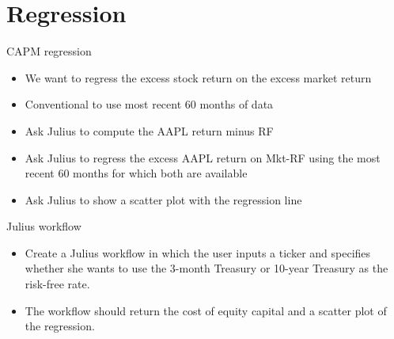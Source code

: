 \documentclass[10pt]{beamer}
\begin{document}
\section{Regression}
\begin{frame}{CAPM regression}
  \begin{itemize}
  \item We want to regress the excess stock return on the excess market return
  \item Conventional to use most recent 60 months of data
  \item Ask Julius to compute the AAPL return minus RF 
  \item Ask Julius to regress the excess AAPL return on Mkt-RF using the most recent 60 months for which both are available
  \item Ask Julius to show a scatter plot with the regression line
\end{itemize}
\end{frame}

\begin{frame}{Julius workflow}
    \begin{itemize}
    \item Create a Julius workflow in which the user inputs a ticker and specifies whether she wants to use the 3-month Treasury or 10-year Treasury as the risk-free rate.  
    \item The workflow should return the cost of equity capital and a scatter plot of the regression.
    \end{itemize}
\end{frame}
\end{document}
